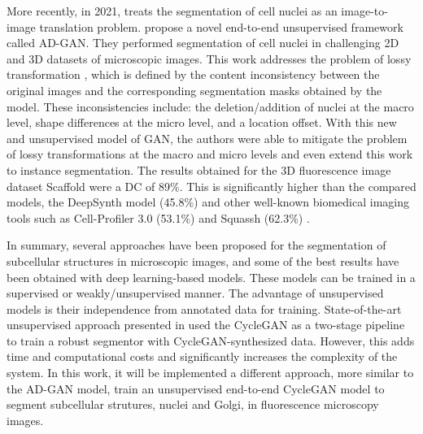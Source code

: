 More recently, in 2021, \cite{adgan} treats the segmentation of cell nuclei as an image-to-image translation problem. \citet{adgan} propose a novel end-to-end unsupervised framework called \ac{AD-GAN}. They performed segmentation of cell nuclei in challenging \ac{2D} and \ac{3D} datasets of microscopic images. This work addresses the problem of lossy transformation \cite{lossy:cyclegan}, which is defined by the content inconsistency between the original images and the corresponding segmentation masks obtained by the model. These inconsistencies include: the deletion/addition of nuclei at the macro level, shape differences at the micro level, and a location offset. With this new and unsupervised model of \ac{GAN}, the authors were able to mitigate the problem of lossy transformations at the macro and micro levels and even extend this work to instance segmentation. The results obtained for the \ac{3D} fluorescence image dataset Scaffold \cite{dataset} were a \ac{DC} of 89\%. This is significantly higher than the compared models, the DeepSynth model \cite{deepsynth} (45.8\%) and other well-known biomedical imaging tools such as Cell-Profiler 3.0 \cite{cellprofiler} (53.1\%) and Squassh (62.3\%) \cite{squassh}.

In summary, several approaches have been proposed for the segmentation of subcellular structures in microscopic images, and some of the best results have been obtained with deep learning-based models. These models can be trained in a supervised or weakly/unsupervised manner. The advantage of unsupervised models is their independence from annotated data for training. State-of-the-art unsupervised approach presented in \cite{deepsynth} used the CycleGAN as a two-stage pipeline to train a robust segmentor with CycleGAN-synthesized data. However, this adds time and computational costs and significantly increases the complexity of the system. In this work, it will be implemented a different approach, more similar to the \ac{AD-GAN} model, train an unsupervised end-to-end CycleGAN model to segment subcellular strutures, nuclei and Golgi, in fluorescence microscopy images.





